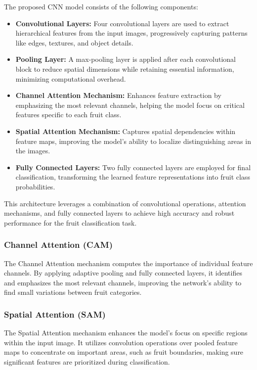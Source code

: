 \documentclass{article}
\begin{document}
The proposed CNN model consists of the following components:

\begin{itemize}
    \item \textbf{Convolutional Layers:} Four convolutional layers are used to extract hierarchical features from the input images, progressively capturing patterns like edges, textures, and object details.
    \item \textbf{Pooling Layer:} A max-pooling layer is applied after each convolutional block to reduce spatial dimensions while retaining essential information, minimizing computational overhead.
    \item \textbf{Channel Attention Mechanism:} Enhances feature extraction by emphasizing the most relevant channels, helping the model focus on critical features specific to each fruit class.
    \item \textbf{Spatial Attention Mechanism:} Captures spatial dependencies within feature maps, improving the model's ability to localize distinguishing areas in the images.
    \item \textbf{Fully Connected Layers:} Two fully connected layers are employed for final classification, transforming the learned feature representations into fruit class probabilities.
\end{itemize}

This architecture leverages a combination of convolutional operations, attention mechanisms, and fully connected layers to achieve high accuracy and robust performance for the fruit classification task.

\subsubsection{Channel Attention (CAM)}
The Channel Attention mechanism computes the importance of individual feature channels. By applying adaptive pooling and fully connected layers, it identifies and emphasizes the most relevant channels, improving the network's ability to find small variations between fruit categories.

\subsubsection{Spatial Attention (SAM)}
The Spatial Attention mechanism enhances the model's focus on specific regions within the input image. It utilizes convolution operations over pooled feature maps to concentrate on important areas, such as fruit boundaries, making sure significant features are prioritized during classification.
\end{document}
